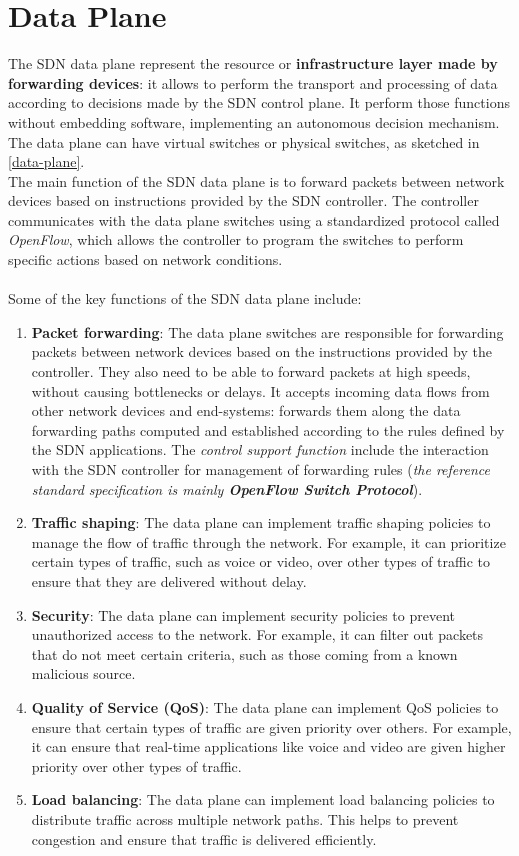 \documentclass[10pt,a4paper]{report}
\theoremstyle{definition}
\begin{document}
\section{Data Plane}\label{sec:sdn-data-plane}
The SDN data plane represent the resource or \textbf{infrastructure layer made by forwarding devices}: it allows to perform the transport and processing of data according to decisions made by the SDN control plane. It perform those functions without embedding software, implementing an autonomous decision mechanism.
The data plane can have virtual switches or physical switches, as sketched in \ref{data-plane}.\\
The main function of the SDN data plane is to forward packets between network devices based on instructions provided by the SDN controller. The controller communicates with the data plane switches using a standardized protocol called \textit{OpenFlow}, which allows the controller to program the switches to perform specific actions based on network conditions.\\\\
Some of the key functions of the SDN data plane include:
\begin{enumerate}
	\item 
	\textbf{Packet forwarding}: The data plane switches are responsible for forwarding packets between network devices based on the instructions provided by the controller. They also need to be able to forward packets at high speeds, without causing bottlenecks or delays. It accepts incoming data flows from other network devices and end-systems: forwards them along the data forwarding paths computed and established according to the rules defined by the SDN applications.
	The \textit{control support function} include the interaction with the SDN controller for management of forwarding rules (\textit{the reference standard specification is mainly \textbf{OpenFlow Switch Protocol}}).
	\item 
	\textbf{Traffic shaping}: The data plane can implement traffic shaping policies to manage the flow of traffic through the network. For example, it can prioritize certain types of traffic, such as voice or video, over other types of traffic to ensure that they are delivered without delay.
	\item 
	\textbf{Security}: The data plane can implement security policies to prevent unauthorized access to the network. For example, it can filter out packets that do not meet certain criteria, such as those coming from a known malicious source.
	\item 
	\textbf{Quality of Service (QoS)}: The data plane can implement QoS policies to ensure that certain types of traffic are given priority over others. For example, it can ensure that real-time applications like voice and video are given higher priority over other types of traffic.
	\item 
	\textbf{Load balancing}: The data plane can implement load balancing policies to distribute traffic across multiple network paths. This helps to prevent congestion and ensure that traffic is delivered efficiently.
\end{enumerate}
\end{document}
